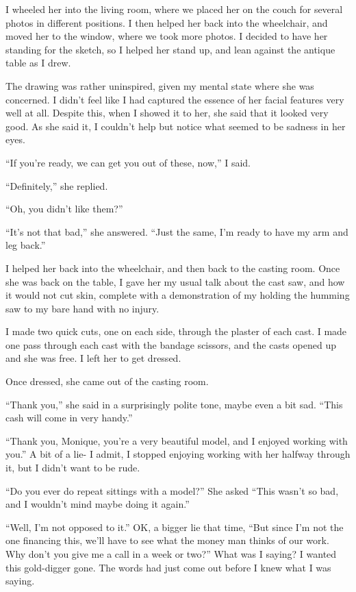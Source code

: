 I wheeled her into the living room, where we placed her on the couch for several photos in
different positions. I then helped her back into the wheelchair, and moved her to the window,
where we took more photos. I decided to have her standing for the sketch, so I helped her stand
up, and lean against the antique table as I drew.

The drawing was rather uninspired, given my mental state where she was concerned. I didn't
feel like I had captured the essence of her facial features very well at all. Despite this, when
I showed it to her, she said that it looked very good. As she said it, I couldn't help but
notice what seemed to be sadness in her eyes.

``If you're ready, we can get you out of these, now,'' I said.

``Definitely,'' she replied.

``Oh, you didn't like them?''

``It's not that bad,'' she answered. ``Just the same, I'm ready to have my arm and leg
back.''

I helped her back into the wheelchair, and then back to the casting room. Once she was back
on the table, I gave her my usual talk about the cast saw, and how it would not cut skin,
complete with a demonstration of my holding the humming saw to my bare hand with no injury.

I made two quick cuts, one on each side, through the plaster of each cast. I made one pass
through each cast with the bandage scissors, and the casts opened up and she was free. I left
her to get dressed.

Once dressed, she came out of the casting room.

``Thank you,'' she said in a surprisingly polite tone, maybe even a bit sad. ``This cash
will come in very handy.''

``Thank you, Monique, you're a very beautiful model, and I enjoyed working with you.'' A bit
of a lie- I admit, I stopped enjoying working with her halfway through it, but I didn't want to
be rude.

``Do you ever do repeat sittings with a model?'' She asked ``This wasn't so bad, and I
wouldn't mind maybe doing it again.''

``Well, I'm not opposed to it.'' OK, a bigger lie that time, ``But since I'm not the one
financing this, we'll have to see what the money man thinks of our work. Why don't you give me a
call in a week or two?'' What was I saying? I wanted this gold-digger gone. The words had just
come out before I knew what I was saying.

